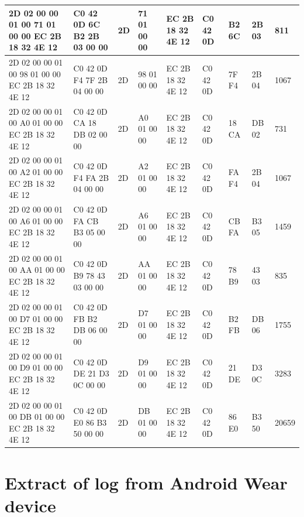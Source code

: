 \documentclass[a4paper,11pt,dvips]{article}
\begin{document}
\begin{landscape}
\begin{table}[htb]
\begin{tabular}{l | l | l | l | l | l | l | l | l}
			2D 02 00 00 01 00 71 01 00 00 EC 2B 18 32 4E 12 & C0 42 0D 6C B2 2B 03 00 00 & 2D & 71 01 00 00 & EC 2B 18 32 4E 12 & C0 42 0D & B2 6C & 2B 03 & 811 \\ \hline
			2D 02 00 00 01 00 98 01 00 00 EC 2B 18 32 4E 12 & C0 42 0D F4 7F 2B 04 00 00 & 2D & 98 01 00 00 & EC 2B 18 32 4E 12 & C0 42 0D & 7F F4 & 2B 04 & 1067 \\ \hline
			2D 02 00 00 01 00 A0 01 00 00 EC 2B 18 32 4E 12 & C0 42 0D CA 18 DB 02 00 00 & 2D & A0 01 00 00 & EC 2B 18 32 4E 12 & C0 42 0D & 18 CA & DB 02 & 731 \\ \hline
			2D 02 00 00 01 00 A2 01 00 00 EC 2B 18 32 4E 12 & C0 42 0D F4 FA 2B 04 00 00 & 2D & A2 01 00 00 & EC 2B 18 32 4E 12 & C0 42 0D & FA F4 & 2B 04 & 1067 \\ \hline
			2D 02 00 00 01 00 A6 01 00 00 EC 2B 18 32 4E 12 & C0 42 0D FA CB B3 05 00 00 & 2D & A6 01 00 00 & EC 2B 18 32 4E 12 & C0 42 0D & CB FA & B3 05 & 1459 \\ \hline
			2D 02 00 00 01 00 AA 01 00 00 EC 2B 18 32 4E 12 & C0 42 0D B9 78 43 03 00 00 & 2D & AA 01 00 00 & EC 2B 18 32 4E 12 & C0 42 0D & 78 B9 & 43 03 & 835 \\ \hline
			2D 02 00 00 01 00 D7 01 00 00 EC 2B 18 32 4E 12 & C0 42 0D FB B2 DB 06 00 00 & 2D & D7 01 00 00 & EC 2B 18 32 4E 12 & C0 42 0D & B2 FB & DB 06 & 1755 \\ \hline
			2D 02 00 00 01 00 D9 01 00 00 EC 2B 18 32 4E 12 & C0 42 0D DE 21 D3 0C 00 00 & 2D & D9 01 00 00 & EC 2B 18 32 4E 12 & C0 42 0D & 21 DE & D3 0C & 3283 \\ \hline
			2D 02 00 00 01 00 DB 01 00 00 EC 2B 18 32 4E 12 & C0 42 0D E0 86 B3 50 00 00 & 2D & DB 01 00 00 & EC 2B 18 32 4E 12 & C0 42 0D & 86 E0 & B3 50 & 20659 \\ \hline
			
		\end{tabular}
\end{table}
\end{landscape}


\newpage
\section{Extract of log from Android Wear device}
\label{app:log}
\end{document}
